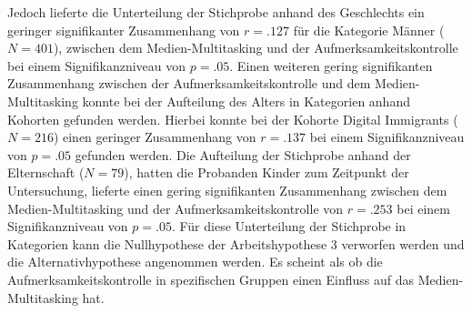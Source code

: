 Jedoch lieferte die Unterteilung der Stichprobe anhand des Geschlechts ein geringer signifikanter Zusammenhang von $r=.127$ für die Kategorie Männer ($N=401$), zwischen dem Medien-Multitasking und der Aufmerksamkeitskontrolle bei einem Signifikanzniveau von $p=.05$. Einen weiteren gering signifikanten Zusammenhang zwischen der Aufmerksamkeitskontrolle und dem Medien-Multitasking konnte bei der Aufteilung des Alters in Kategorien anhand Kohorten gefunden werden. Hierbei konnte bei der Kohorte Digital Immigrants ($N=216$) einen geringer Zusammenhang von $r=.137$ bei einem Signifikanzniveau von $p=.05$ gefunden werden. Die Aufteilung der Stichprobe anhand der Elternschaft ($N=79$), hatten die Probanden Kinder zum Zeitpunkt der Untersuchung, lieferte einen gering signifikanten Zusammenhang zwischen dem Medien-Multitasking und der Aufmerksamkeitskontrolle von $r=.253$ bei einem Signifikanzniveau von $p=.05$. Für diese Unterteilung der Stichprobe in Kategorien kann die Nullhypothese der Arbeitshypothese 3 verworfen werden und die Alternativhypothese angenommen werden. Es scheint als ob die Aufmerksamkeitskontrolle in spezifischen Gruppen einen Einfluss auf das Medien-Multitasking hat.

